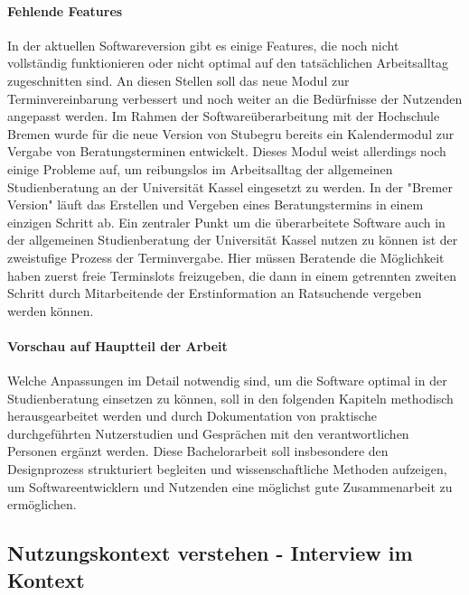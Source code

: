 \paragraph{Fehlende Features}
In der aktuellen Softwareversion gibt es einige Features, die noch nicht
vollständig funktionieren oder nicht optimal auf den tatsächlichen
Arbeitsalltag zugeschnitten sind. An diesen Stellen soll das neue Modul zur
Terminvereinbarung verbessert und noch weiter an die Bedürfnisse der Nutzenden
angepasst werden. Im Rahmen der Softwareüberarbeitung mit der Hochschule Bremen
wurde für die neue Version von Stubegru bereits ein Kalendermodul zur Vergabe
von Beratungsterminen entwickelt. Dieses Modul weist allerdings noch einige
Probleme auf, um reibungslos im Arbeitsalltag der allgemeinen Studienberatung
an der Universität Kassel eingesetzt zu werden. In der "Bremer Version" läuft
das Erstellen und Vergeben eines Beratungstermins in einem einzigen Schritt ab.
Ein zentraler Punkt um die überarbeitete Software auch in der allgemeinen
Studienberatung der Universität Kassel nutzen zu können ist der zweistufige
Prozess der Terminvergabe. Hier müssen Beratende die Möglichkeit haben zuerst
freie Terminslots freizugeben, die dann in einem getrennten zweiten Schritt
durch Mitarbeitende der Erstinformation an Ratsuchende vergeben werden können.

\paragraph{Vorschau auf Hauptteil der Arbeit}
Welche Anpassungen im Detail notwendig sind, um die Software optimal in der
Studienberatung einsetzen zu können, soll in den folgenden Kapiteln methodisch
herausgearbeitet werden und durch Dokumentation von praktische durchgeführten
Nutzerstudien und Gesprächen mit den verantwortlichen Personen ergänzt werden.
Diese Bachelorarbeit soll insbesondere den Designprozess strukturiert begleiten
und wissenschaftliche Methoden aufzeigen, um Softwareentwicklern und Nutzenden
eine möglichst gute Zusammenarbeit zu ermöglichen.

\subsection{Nutzungskontext verstehen - Interview im Kontext}
\label{subsection:IIK}

